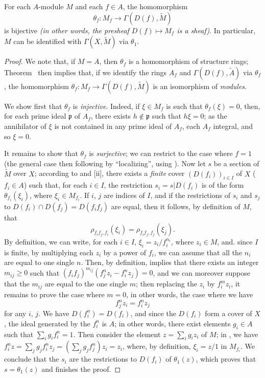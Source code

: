\begin{theorem}[1.3.7]
\label{1.1.3.7}
For each $A$-module $M$ and each $f\in A$, the homomorphism
\[
  \theta_f:M_f\to\Gamma(D(f),\widetilde{M})
\]
is bijective \emph{(in other words, the presheaf $D(f)\mapsto M_f$ is a \emph{sheaf})}.
In particular, $M$ can be identified with $\Gamma(X,\widetilde{M})$ via $\theta_1$.
\end{theorem}

\begin{proof}
\label{proof-1.1.3.7}
We note that, if $M=A$, then $\theta_f$ is a homomorphism of structure rings;
Theorem~ then implies that, if we identify the rings $A_f$ and $\Gamma(D(f),\widetilde{A})$ via $\theta_f$, the homomorphism $\theta_f:M_f\to\Gamma(D(f),\widetilde{M})$ is an isomorphism of \emph{modules}.

We show first that $\theta_f$ is \emph{injective}.
Indeed, if $\xi\in M_f$ is such that $\theta_f(\xi)=0$, then, for each prime ideal $\mathfrak{p}$ of $A_f$, there exists $h\not\in\mathfrak{p}$ such that $h\xi=0$;
as the annihilator of $\xi$ is not contained in any prime ideal of $A_f$, each $A_f$ integral, and so $\xi=0$.

It remains to show that $\theta_f$ is \emph{surjective};
we can restrict to the case where $f=1$ (the general case then following by ``localizing'', using ).
Now let $s$ be a section of $\widetilde{M}$ over $X$;
according to  and [ii], there exists a \emph{finite} cover $(D(f_i))_{i\in I}$ of $X$ ($f_i\in A$) such that, for each $i\in I$, the restriction $s_i=s|D(f_i)$ is of the form $\theta_{f_i}(\xi_i)$, where $\xi_i\in M_{f_i}$.
If $i$, $j$ are indices of $I$, and if the restrictions of $s_i$ and $s_j$ to $D(f_i)\cap D(f_j)=D(f_i f_j)$ are equal, then it follows, by definition of $M$, that
\[
  \label{1.1.3.7.1}
  \rho_{f_i f_j,f_i}(\xi_i)=\rho_{f_i f_j,f_j}(\xi_j).
  \tag{1.3.7.1}
\]
By definition, we can write, for each $i\in I$, $\xi_i=z_i/f_i^{n_i}$, where $z_i\in M$, and. since $I$ is finite, by multiplying each $z_i$ by a power of $f_i$, we can assume that all the $n_i$ are equal to one single $n$.
Then, by definition,  implies that there exists an integer $m_{ij}\geq 0$ such that $(f_i f_j)^{m_{ij}}(f_j^n z_i-f_i^n z_j)=0$, and we can moreover suppose that the $m_{ij}$ are equal to the one single $m$;
then replacing the $z_i$ by $f_i^m z_i$, it remains to prove the case where $m=0$, in other words, the case where we have
\[
  \label{1.1.3.7.2}
  f_j^n z_i=f_i^n z_j
  \tag{1.3.7.2}
\]
for any $i$, $j$.
We have $D(f_i^n)=D(f_i)$, and since the $D(f_i)$ form a cover of $X$, the ideal generated by the $f_i^n$ is $A$;
in other words, there exist elements $g_i\in A$ such that $\sum_i g_i f_i^n=1$.
Then consider the element $z=\sum_i g_i z_i$ of $M$;
in , we have $f_i^n z=\sum_j g_j f_i^n z_j=(\sum_j g_j f_j^n)z_i=z_i$, where, by definition, $\xi_i=z/1$ in $M_{f_i}$.
We conclude
that the $s_i$ are the restrictions to $D(f_i)$ of $\theta_1(z)$, which proves that $s=\theta_1(z)$ and finishes the proof.
\end{proof}

